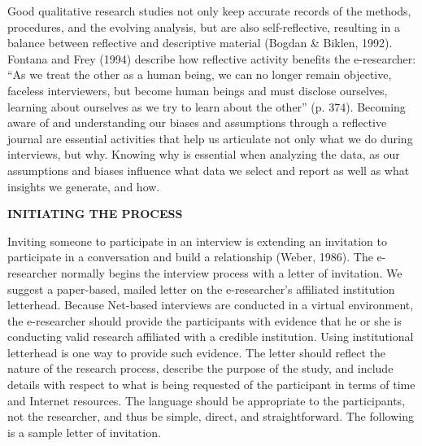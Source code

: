 \documentclass[a4paper]{book}
\begin{document}
\setcounter{page}{91}

 Good qualitative research studies not only keep accurate records of the methods, procedures, and the evolving analysis, but are also self-reflective, resulting in a balance between reflective and descriptive material (Bogdan \& Biklen, 1992). Fontana and Frey (1994) describe how reflective activity benefits the e-researcher: {``}As we treat the other as a human being, we can no longer remain objective, faceless interviewers, but become human beings and must disclose ourselves, learning about ourselves as we try to learn about the other'' (p. 374). Becoming aware of and understanding our biases and assumptions through a reflective journal are essential activities that help us articulate not only what we do during interviews, but why. Knowing why is essential when analyzing the data, as our assumptions and biases influence what data we select and report as well as what insights we generate, and how.




\begin{flushleft}
\vspace{5mm}
\hspace{-2cm}
\textbf{{\Large INITIATING THE PROCESS}}
\vspace{5mm}
\end{flushleft}


Inviting someone to participate in an interview is extending an invitation to participate in a conversation and build a relationship (Weber, 1986). The e-researcher normally begins the interview process with a letter of invitation. We suggest a paper-based, mailed letter on the e-researcher's affiliated institution letterhead. Because Net-based interviews are conducted in a virtual environment, the e-researcher should provide the participants with evidence that he or she is conducting valid research affiliated with a credible institution. Using institutional letterhead is one way to provide such evidence. The letter should reflect the nature of the research process, describe the purpose of the study, and include details with respect to what is being requested of the participant in terms of time and Internet resources. The language should be appropriate to the participants, not the researcher, and thus be simple, direct, and straightforward. The following is a sample letter of invitation.
\end{document}
